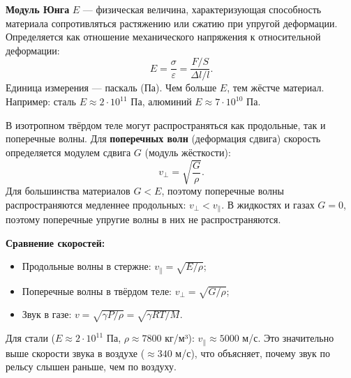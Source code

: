 \begin{definition}
\textbf{Модуль Юнга} $E$ --- физическая величина, характеризующая способность материала сопротивляться растяжению или сжатию при упругой деформации. Определяется как отношение механического напряжения к относительной деформации:
\begin{equation}
    E = \frac{\sigma}{\varepsilon} = \frac{F/S}{\Delta l / l}.
\end{equation}
Единица измерения --- паскаль (Па). Чем больше $E$, тем жёстче материал. Например: сталь $E \approx 2 \cdot 10^{11}$ Па, алюминий $E \approx 7 \cdot 10^{10}$ Па.
\end{definition}

\begin{property}
В изотропном твёрдом теле могут распространяться как продольные, так и поперечные волны. Для \textbf{поперечных волн} (деформация сдвига) скорость определяется модулем сдвига $G$ (модуль жёсткости):
\begin{equation}
    v_{\perp} = \sqrt{\frac{G}{\rho}}. \label{eq:shear_speed}
\end{equation}
Для большинства материалов $G < E$, поэтому поперечные волны распространяются медленнее продольных: $v_{\perp} < v_{\parallel}$. В жидкостях и газах $G = 0$, поэтому поперечные упругие волны в них не распространяются.
\end{property}

\begin{remark}
\textbf{Сравнение скоростей:}
\begin{itemize}
    \item Продольные волны в стержне: $v_{\parallel} = \sqrt{E/\rho}$;
    \item Поперечные волны в твёрдом теле: $v_{\perp} = \sqrt{G/\rho}$;
    \item Звук в газе: $v = \sqrt{\gamma P / \rho} = \sqrt{\gamma RT / M}$.
\end{itemize}
Для стали ($E \approx 2 \cdot 10^{11}$ Па, $\rho \approx 7800$ кг/м³): $v_{\parallel} \approx 5000$ м/с. Это значительно выше скорости звука в воздухе ($\approx 340$ м/с), что объясняет, почему звук по рельсу слышен раньше, чем по воздуху.
\end{remark}

